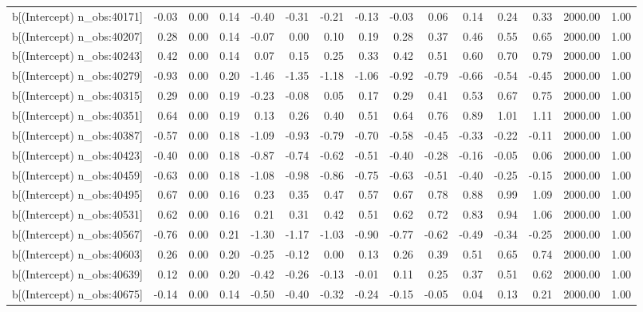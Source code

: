 \begin{table}[ht]
\begin{tabular}{rrrrrrrrrrrrrrr}
  b[(Intercept) n\_obs:40171] & -0.03 & 0.00 & 0.14 & -0.40 & -0.31 & -0.21 & -0.13 & -0.03 & 0.06 & 0.14 & 0.24 & 0.33 & 2000.00 & 1.00 \\ 
  b[(Intercept) n\_obs:40207] & 0.28 & 0.00 & 0.14 & -0.07 & 0.00 & 0.10 & 0.19 & 0.28 & 0.37 & 0.46 & 0.55 & 0.65 & 2000.00 & 1.00 \\ 
  b[(Intercept) n\_obs:40243] & 0.42 & 0.00 & 0.14 & 0.07 & 0.15 & 0.25 & 0.33 & 0.42 & 0.51 & 0.60 & 0.70 & 0.79 & 2000.00 & 1.00 \\ 
  b[(Intercept) n\_obs:40279] & -0.93 & 0.00 & 0.20 & -1.46 & -1.35 & -1.18 & -1.06 & -0.92 & -0.79 & -0.66 & -0.54 & -0.45 & 2000.00 & 1.00 \\ 
  b[(Intercept) n\_obs:40315] & 0.29 & 0.00 & 0.19 & -0.23 & -0.08 & 0.05 & 0.17 & 0.29 & 0.41 & 0.53 & 0.67 & 0.75 & 2000.00 & 1.00 \\ 
  b[(Intercept) n\_obs:40351] & 0.64 & 0.00 & 0.19 & 0.13 & 0.26 & 0.40 & 0.51 & 0.64 & 0.76 & 0.89 & 1.01 & 1.11 & 2000.00 & 1.00 \\ 
  b[(Intercept) n\_obs:40387] & -0.57 & 0.00 & 0.18 & -1.09 & -0.93 & -0.79 & -0.70 & -0.58 & -0.45 & -0.33 & -0.22 & -0.11 & 2000.00 & 1.00 \\ 
  b[(Intercept) n\_obs:40423] & -0.40 & 0.00 & 0.18 & -0.87 & -0.74 & -0.62 & -0.51 & -0.40 & -0.28 & -0.16 & -0.05 & 0.06 & 2000.00 & 1.00 \\ 
  b[(Intercept) n\_obs:40459] & -0.63 & 0.00 & 0.18 & -1.08 & -0.98 & -0.86 & -0.75 & -0.63 & -0.51 & -0.40 & -0.25 & -0.15 & 2000.00 & 1.00 \\ 
  b[(Intercept) n\_obs:40495] & 0.67 & 0.00 & 0.16 & 0.23 & 0.35 & 0.47 & 0.57 & 0.67 & 0.78 & 0.88 & 0.99 & 1.09 & 2000.00 & 1.00 \\ 
  b[(Intercept) n\_obs:40531] & 0.62 & 0.00 & 0.16 & 0.21 & 0.31 & 0.42 & 0.51 & 0.62 & 0.72 & 0.83 & 0.94 & 1.06 & 2000.00 & 1.00 \\ 
  b[(Intercept) n\_obs:40567] & -0.76 & 0.00 & 0.21 & -1.30 & -1.17 & -1.03 & -0.90 & -0.77 & -0.62 & -0.49 & -0.34 & -0.25 & 2000.00 & 1.00 \\ 
  b[(Intercept) n\_obs:40603] & 0.26 & 0.00 & 0.20 & -0.25 & -0.12 & 0.00 & 0.13 & 0.26 & 0.39 & 0.51 & 0.65 & 0.74 & 2000.00 & 1.00 \\ 
  b[(Intercept) n\_obs:40639] & 0.12 & 0.00 & 0.20 & -0.42 & -0.26 & -0.13 & -0.01 & 0.11 & 0.25 & 0.37 & 0.51 & 0.62 & 2000.00 & 1.00 \\ 
  b[(Intercept) n\_obs:40675] & -0.14 & 0.00 & 0.14 & -0.50 & -0.40 & -0.32 & -0.24 & -0.15 & -0.05 & 0.04 & 0.13 & 0.21 & 2000.00 & 1.00 \\ 

\end{tabular}
\end{table}
